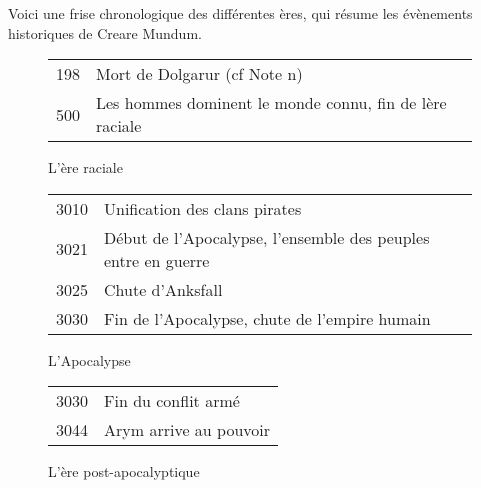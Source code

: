 \renewcommand{\arraystretch}{1.8}

Voici une frise chronologique des différentes ères, qui résume les évènements historiques de Creare Mundum.
\begin{figure}[h]
\begin{tabular}{r | l}
198 & Mort de Dolgarur (cf Note n\degre236)\\
500 & Les hommes dominent le monde connu, fin de lère raciale
\end{tabular}
\caption{L'ère raciale}
\end{figure}

\begin{figure}[h]
\begin{tabular}{r | l}
3010 & Unification des clans pirates\\
3021 & Début de l'Apocalypse, l'ensemble des peuples entre en guerre\\
3025 & Chute d'Anksfall\\
3030 & Fin de l'Apocalypse, chute de l'empire humain
\end{tabular}
\caption{L'Apocalypse}
\end{figure}

\begin{figure}[h]
\begin{tabular}{r | l}
3030 & Fin du conflit armé\\
3044 & Arym arrive au pouvoir\\
\end{tabular}
\caption{L'ère post-apocalyptique}
\end{figure}